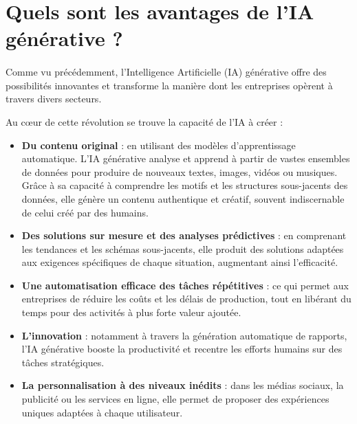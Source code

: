         \section{Quels sont les avantages de l’IA générative ?}
            \paragraph{}
            Comme vu précédemment, l'Intelligence Artificielle (IA) générative offre des possibilités innovantes et transforme la manière dont les entreprises opèrent à travers divers secteurs.

            Au cœur de cette révolution se trouve la capacité de l'IA à créer :

            \begin{itemize}[label=--]
                \item \textbf{Du contenu original} : en utilisant des modèles d'apprentissage automatique. L’IA générative analyse et apprend à partir de vastes ensembles de données pour produire de nouveaux textes, images, vidéos ou musiques. Grâce à sa capacité à comprendre les motifs et les structures sous-jacents des données, elle génère un contenu authentique et créatif, souvent indiscernable de celui créé par des humains.
                
                \item \textbf{Des solutions sur mesure et des analyses prédictives} : en comprenant les tendances et les schémas sous-jacents, elle produit des solutions adaptées aux exigences spécifiques de chaque situation, augmentant ainsi l'efficacité.
                
                \item \textbf{Une automatisation efficace des tâches répétitives} : ce qui permet aux entreprises de réduire les coûts et les délais de production, tout en libérant du temps pour des activités à plus forte valeur ajoutée.
                
                \item \textbf{L’innovation} : notamment à travers la génération automatique de rapports, l'IA générative booste la productivité et recentre les efforts humains sur des tâches stratégiques.
                
                \item \textbf{La personnalisation à des niveaux inédits} : dans les médias sociaux, la publicité ou les services en ligne, elle permet de proposer des expériences uniques adaptées à chaque utilisateur.
            \end{itemize}

